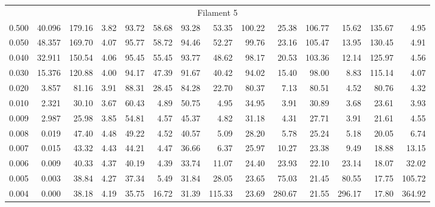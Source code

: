 \begin{tabular}{@{}lrrrrrrrrrrrrr@{}}
\midrule
\multicolumn{14}{c}{Filament 5} \\
\cmidrule{1-14}
0.500 & 40.096 & 179.16 & 3.82 & 93.72 & 58.68 & 93.28 & 53.35 & 100.22 & 25.38 & 106.77 & 15.62 & 135.67 & 4.95 \\
0.050 & 48.357 & 169.70 & 4.07 & 95.77 & 58.72 & 94.46 & 52.27 & 99.76 & 23.16 & 105.47 & 13.95 & 130.45 & 4.91 \\
0.040 & 32.911 & 150.54 & 4.06 & 95.45 & 55.45 & 93.77 & 48.62 & 98.17 & 20.53 & 103.36 & 12.14 & 125.97 & 4.56 \\
0.030 & 15.376 & 120.88 & 4.00 & 94.17 & 47.39 & 91.67 & 40.42 & 94.02 & 15.40 & 98.00 & 8.83 & 115.14 & 4.07 \\
0.020 & 3.857 & 81.16 & 3.91 & 88.31 & 28.45 & 84.28 & 22.70 & 80.37 & 7.13 & 80.51 & 4.52 & 80.76 & 4.32 \\
0.010 & 2.321 & 30.10 & 3.67 & 60.43 & 4.89 & 50.75 & 4.95 & 34.95 & 3.91 & 30.89 & 3.68 & 23.61 & 3.93 \\
0.009 & 2.987 & 25.98 & 3.85 & 54.81 & 4.57 & 45.37 & 4.82 & 31.18 & 4.31 & 27.71 & 3.91 & 21.61 & 4.55 \\
0.008 & 0.019 & 47.40 & 4.48 & 49.22 & 4.52 & 40.57 & 5.09 & 28.20 & 5.78 & 25.24 & 5.18 & 20.05 & 6.74 \\
0.007 & 0.015 & 43.32 & 4.43 & 44.21 & 4.47 & 36.66 & 6.37 & 25.97 & 10.27 & 23.38 & 9.49 & 18.88 & 13.15 \\
0.006 & 0.009 & 40.33 & 4.37 & 40.19 & 4.39 & 33.74 & 11.07 & 24.40 & 23.93 & 22.10 & 23.14 & 18.07 & 32.02 \\
0.005 & 0.003 & 38.84 & 4.27 & 37.34 & 5.49 & 31.84 & 28.05 & 23.65 & 75.03 & 21.45 & 80.55 & 17.75 & 105.72 \\
0.004 & 0.000 & 38.18 & 4.19 & 35.75 & 16.72 & 31.39 & 115.33 & 23.69 & 280.67 & 21.55 & 296.17 & 17.80 & 364.92 \\

\bottomrule
\end{tabular}

